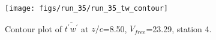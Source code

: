 \begin{figure}[H]
\centering
\texttt{[image: figs/run\_35/run\_35\_tw\_contour]}
\caption{Contour plot of $\overline{t^\prime w^\prime}$ at $z/c$=8.50, $V_{free}$=23.29, station 4.}
\label{fig:run_35_tw_contour}
\end{figure}


